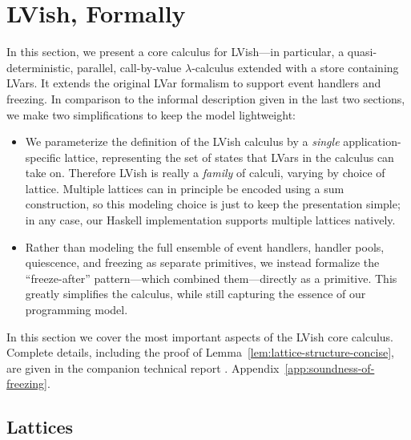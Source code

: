 \section{LVish, Formally}\label{section:language}

In this section, we present a core calculus for LVish---in particular, a
quasi-deterministic, parallel, call-by-value $\lambda$-calculus extended with a
store containing LVars.  It extends the original LVar formalism to support event
handlers and freezing.  In comparison to the informal description given in the
last two sections, we make two simplifications to keep the model lightweight:
\begin{itemize}
\item We parameterize the definition of the LVish calculus by a \emph{single}
  application-specific lattice, representing the set of states that LVars in the
  calculus can take on. Therefore LVish is really a \emph{family} of
  calculi, varying by choice of lattice.  Multiple lattices can in principle be
  encoded using a sum construction, so this modeling choice is just to keep the
  presentation simple; in any case, our Haskell implementation supports multiple
  lattices natively.
\item Rather than modeling the full ensemble of event handlers, handler pools,
  quiescence, and freezing as separate primitives, we instead formalize the
  ``freeze-after'' pattern---which combined them---directly as a primitive.
  This greatly simplifies the calculus, while still capturing the
  essence of our programming model.
\end{itemize}

\noindent In this section we cover the most important aspects of the
LVish core calculus.  Complete details, including the proof of
Lemma~\ref{lem:lattice-structure-concise},
 are given in
\ifx\fulltr\undefined
the companion
technical report \cite{Freeze-TR}.
\else
Appendix~\ref{app:soundness-of-freezing}.
\fi

\subsection{Lattices}

